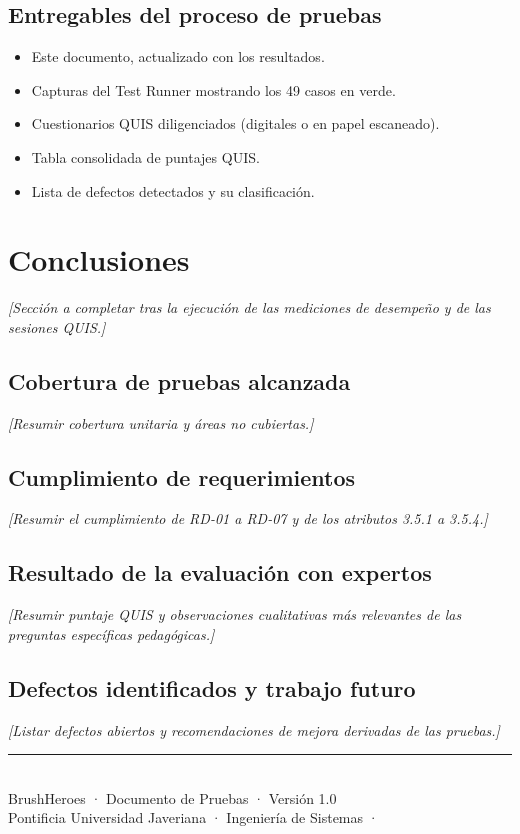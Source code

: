 \documentclass[12pt, a4paper]{article}
\begin{document}
\subsection{Entregables del proceso de pruebas}

\begin{itemize}[leftmargin=1.5cm, itemsep=3pt]
  \item Este documento, actualizado con los resultados.
  \item Capturas del Test Runner mostrando los 49 casos en verde.
  \item Cuestionarios QUIS diligenciados (digitales o en papel escaneado).
  \item Tabla consolidada de puntajes QUIS.
  \item Lista de defectos detectados y su clasificación.
\end{itemize}

\section{Conclusiones}

\textit{[Sección a completar tras la ejecución de las mediciones de desempeño
y de las sesiones QUIS.]}

\subsection{Cobertura de pruebas alcanzada}
\textit{[Resumir cobertura unitaria y áreas no cubiertas.]}

\subsection{Cumplimiento de requerimientos}
\textit{[Resumir el cumplimiento de RD-01 a RD-07 y de los atributos
3.5.1 a 3.5.4.]}

\subsection{Resultado de la evaluación con expertos}
\textit{[Resumir puntaje QUIS y observaciones cualitativas más relevantes
de las preguntas específicas pedagógicas.]}

\subsection{Defectos identificados y trabajo futuro}
\textit{[Listar defectos abiertos y recomendaciones de mejora derivadas
de las pruebas.]}

\vfill
\begin{center}
  \small\color{heroGray}\rule{0.5\textwidth}{0.4pt}\\[6pt]
  BrushHeroes · Documento de Pruebas · Versión 1.0\\
  Pontificia Universidad Javeriana · Ingeniería de Sistemas · \the\year
\end{center}
\end{document}
